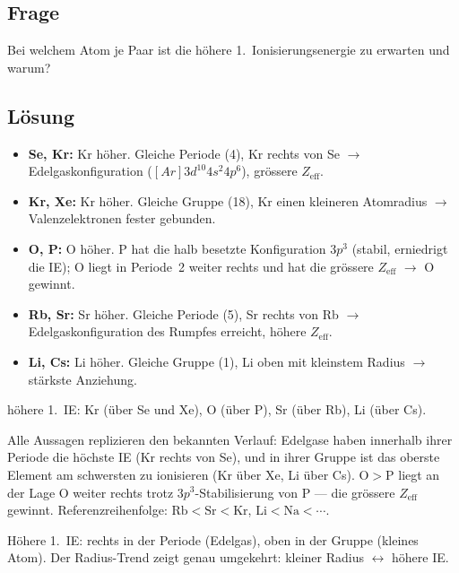 
\subsection*{Frage}
Bei welchem Atom je Paar ist die höhere 1.\ Ionisierungsenergie zu erwarten und
warum?

\subsection*{Lösung}
\begin{itemize}
  \item \textbf{Se, Kr:} Kr höher. Gleiche Periode (4), Kr rechts von Se $\to$
        Edelgaskonfiguration ($[Ar]3d^{10}4s^2 4p^6$), grössere $Z_{\mathrm{eff}}$.
  \item \textbf{Kr, Xe:} Kr höher. Gleiche Gruppe (18), Kr einen kleineren
        Atomradius $\to$ Valenzelektronen fester gebunden.
  \item \textbf{O, P:} O höher. P hat die halb besetzte Konfiguration $3p^3$
        (stabil, erniedrigt die IE); O liegt in Periode~2 weiter rechts und hat
        die grössere $Z_{\mathrm{eff}}$ $\to$ O gewinnt.
  \item \textbf{Rb, Sr:} Sr höher. Gleiche Periode (5), Sr rechts von Rb $\to$
        Edelgaskonfiguration des Rumpfes erreicht, höhere $Z_{\mathrm{eff}}$.
  \item \textbf{Li, Cs:} Li höher. Gleiche Gruppe (1), Li oben mit kleinstem
        Radius $\to$ stärkste Anziehung.
\end{itemize}

\begin{ergebnis}
höhere 1.\ IE: Kr (über Se und Xe), O (über P), Sr (über Rb), Li (über Cs).
\end{ergebnis}

\begin{kontrolle}
Alle Aussagen replizieren den bekannten Verlauf: Edelgase haben innerhalb ihrer
Periode die höchste IE (Kr rechts von Se), und in ihrer Gruppe ist das oberste
Element am schwersten zu ionisieren (Kr über Xe, Li über Cs). $\mathrm{O}>\mathrm{P}$
liegt an der Lage O weiter rechts trotz $3p^3$-Stabilisierung von P --- die
grössere $Z_{\mathrm{eff}}$ gewinnt. Referenzreihenfolge: $\mathrm{Rb<Sr<Kr}$,
$\mathrm{Li<Na<\dotsb}$.
\end{kontrolle}

\begin{merksatz}
Höhere 1.\ IE: rechts in der Periode (Edelgas), oben in der Gruppe (kleines
Atom). Der Radius-Trend zeigt genau umgekehrt: kleiner Radius $\leftrightarrow$
höhere IE.
\end{merksatz}
